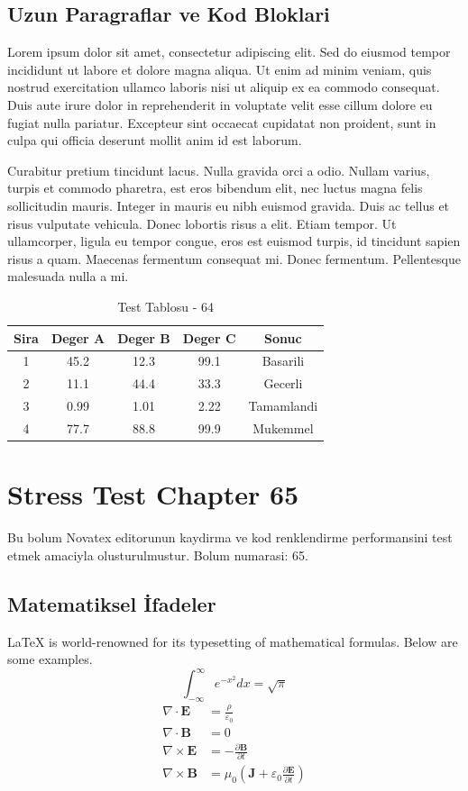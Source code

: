 \documentclass[12pt,a4paper]{article}
\begin{document}
\subsection{Uzun Paragraflar ve Kod Bloklari}
Lorem ipsum dolor sit amet, consectetur adipiscing elit. Sed do eiusmod tempor incididunt ut labore et dolore magna aliqua. Ut enim ad minim veniam, quis nostrud exercitation ullamco laboris nisi ut aliquip ex ea commodo consequat. Duis aute irure dolor in reprehenderit in voluptate velit esse cillum dolore eu fugiat nulla pariatur. Excepteur sint occaecat cupidatat non proident, sunt in culpa qui officia deserunt mollit anim id est laborum.

Curabitur pretium tincidunt lacus. Nulla gravida orci a odio. Nullam varius, turpis et commodo pharetra, est eros bibendum elit, nec luctus magna felis sollicitudin mauris. Integer in mauris eu nibh euismod gravida. Duis ac tellus et risus vulputate vehicula. Donec lobortis risus a elit. Etiam tempor. Ut ullamcorper, ligula eu tempor congue, eros est euismod turpis, id tincidunt sapien risus a quam. Maecenas fermentum consequat mi. Donec fermentum. Pellentesque malesuada nulla a mi.

\begin{table}[h!]
\centering
\begin{tabular}{|c|c|c|c|c|}
\hline
\textbf{Sira} & \textbf{Deger A} & \textbf{Deger B} & \textbf{Deger C} & \textbf{Sonuc} \\
\hline
1 & 45.2 & 12.3 & 99.1 & Basarili \\
2 & 11.1 & 44.4 & 33.3 & Gecerli \\
3 & 0.99 & 1.01 & 2.22 & Tamamlandi \\
4 & 77.7 & 88.8 & 99.9 & Mukemmel \\
\hline
\end{tabular}
\caption{Test Tablosu - 64}
\end{table}

\newpage
\section{Stress Test Chapter 65}
Bu bolum Novatex editorunun kaydirma ve kod renklendirme performansini test etmek amaciyla olusturulmustur. Bolum numarasi: 65.

\subsection{Matematiksel İfadeler}
\LaTeX{} is world-renowned for its typesetting of mathematical formulas. Below are some examples.
\begin{equation}
\int_{-\infty}^{\infty} e^{-x^2} dx = \sqrt{\pi}
\end{equation}
\begin{align}
\nabla \cdot \mathbf{E} &= \frac{\rho}{\varepsilon_0} \\
\nabla \cdot \mathbf{B} &= 0 \\
\nabla \times \mathbf{E} &= -\frac{\partial \mathbf{B}}{\partial t} \\
\nabla \times \mathbf{B} &= \mu_0\left(\mathbf{J} + \varepsilon_0 \frac{\partial \mathbf{E}}{\partial t}\right)
\end{align}
\end{document}

